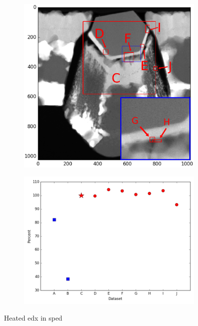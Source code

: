 \begin{figure}
	\begin{subfigure}{.5\textwidth}
		\centering
		\includegraphics[width=\linewidth]{"fig/heated-images-in-overview-ink2"}
		\caption{}
		\label{fig:heated-images-in-overview}
	\end{subfigure}%
	\begin{subfigure}{.5\textwidth}
		\centering
		\includegraphics[width=\linewidth]{"fig/heated-matching-values"}
		\caption{}
		\label{fig:heated-matching-values}
	\end{subfigure}
	\caption{Heated edx in sped}
	\label{fig:heated-overview}
\end{figure}

